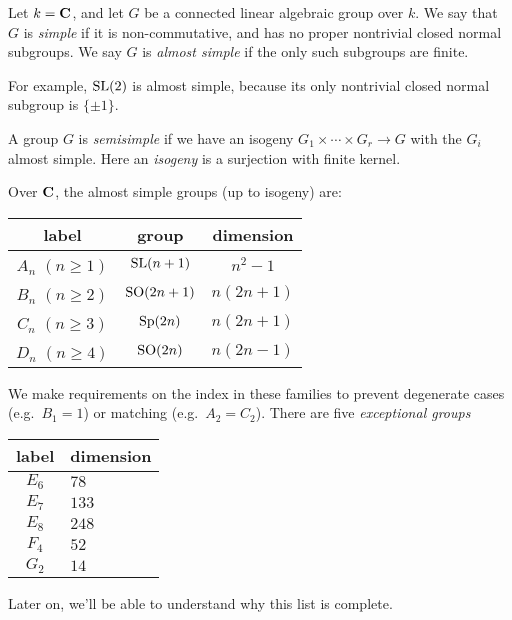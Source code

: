 \begin{example}[Semisimple]
Let $k=\mathbf{C}$, and let $G$ be a connected linear 
algebraic group over $k$. We say that $G$ is \emph{simple} if it is 
non-commutative, and has no proper nontrivial closed normal subgroups. We say 
$G$ is \emph{almost simple} if the only such subgroups are finite. 

For example, $\operatorname{SL}(2)$ is almost simple, because its only nontrivial 
closed normal subgroup is $\{\pm 1\}$. 

A group $G$ is \emph{semisimple} if we have an isogeny 
$G_1\times \cdots \times G_r\to G$ with the $G_i$ almost simple. Here an 
\emph{isogeny} is a surjection with finite kernel. 
\end{example}

Over $\mathbf{C}$, the almost simple groups (up to isogeny) are: 
\begin{center}
\begin{tabular}{c|c|c}
label & group & dimension \\ \hline
$A_n$ $(n\geqslant 1)$ & $\operatorname{SL}(n+1)$ & $n^2-1$ \\
$B_n$ $(n\geqslant 2)$ & $\operatorname{SO}(2n+1)$ & $n(2n+1)$\\
$C_n$ $(n\geqslant 3)$ & $\operatorname{Sp}(2n)$ & $n(2n+1)$ \\
$D_n$ $(n\geqslant 4)$ & $\operatorname{SO}(2n)$ & $n(2n-1)$
\end{tabular}
\end{center}
We make requirements on the index in these families to prevent degenerate 
cases (e.g.~$B_1=1$) or matching (e.g.~$A_2=C_2$). There are five 
\emph{exceptional groups} 
\begin{center}
\begin{tabular}{c|l}
label & dimension \\ \hline
$E_6$ & $78$ \\
$E_7$ & $133$ \\
$E_8$ & $248$ \\
$F_4$ & $52$ \\
$G_2$ & $14$
\end{tabular}
\end{center}
Later on, we'll be able to understand why this list is complete.
